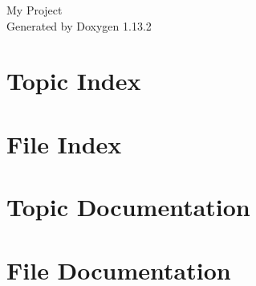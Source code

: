 \documentclass[twoside]{book}
\newcommand{\+}{\discretionary{\mbox{\scriptsize$\hookleftarrow$}}{}{}}
\newcommand{\clearemptydoublepage}{%
    \newpage{\pagestyle{empty}\cleardoublepage}%
  }
\begin{document}
  \raggedbottom
    \hypersetup{pageanchor=false,
                bookmarksnumbered=true,
                pdfencoding=unicode
               }
  \begin{titlepage}
  \vspace*{7cm}
  \begin{center}%
  {\Large My Project}\\
  \vspace*{1cm}
  {\large Generated by Doxygen 1.13.2}\\
  \end{center}
  \end{titlepage}
  \clearemptydoublepage
  \tableofcontents
  \clearemptydoublepage
  \hypersetup{pageanchor=true}
\chapter{Topic Index}

\chapter{File Index}

\chapter{Topic Documentation}


\chapter{File Documentation}

























  \backmatter
  \newpage
  \clearemptydoublepage
  \printindex
\end{document}
